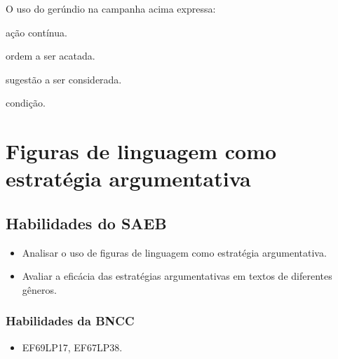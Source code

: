 
O uso do gerúndio na campanha acima expressa:

\begin{escolha}

  \item ação contínua.
  \item ordem a ser acatada.
  \item sugestão a ser considerada.
  \item condição.

\end{escolha}


\chapter{Figuras de linguagem como estratégia argumentativa}

\section*{Habilidades do SAEB}

\begin{itemize}
  
  \item Analisar o uso de figuras de linguagem como estratégia argumentativa.

  \item Avaliar a eficácia das estratégias argumentativas em textos de diferentes gêneros.

\end{itemize}

\subsection{Habilidades da BNCC}

\begin{itemize}

  \item EF69LP17, EF67LP38.

\end{itemize}

